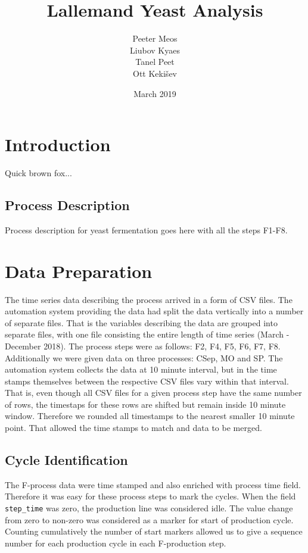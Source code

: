 \documentclass{article}
\title{Lallemand Yeast Analysis}
\author{Peeter Meos \\ Liubov Kyaes \\ Tanel Peet \\Ott Keki{\v s}ev}
\date{March 2019}
\begin{document}
\maketitle

\tableofcontents

\section{Introduction}
Quick brown fox...
\subsection{Process Description}
Process description for yeast fermentation goes here with all the steps F1-F8.

\section{Data Preparation}
The time series data describing the process arrived in a form of CSV files. The automation system providing the data had split the data vertically into a number of separate files. That is the variables describing the data are grouped into separate files, with one file consisting the entire length of time series (March - December 2018). The process steps were as follows: F2, F4, F5, F6, F7, F8. Additionally we were given data on three processes: CSep, MO and SP. The automation system collects the data at 10 minute interval, but in the time stamps themselves between the respective CSV files vary within that interval. That is, even though all CSV files for a given process step have the same number of rows, the timestaps for these rows are shifted but remain inside 10 minute window. Therefore we rounded all timestamps to the nearest smaller 10 minute point. That allowed the time stamps to match and data to be merged.

\subsection{Cycle Identification}
The F-process data were time stamped and also enriched with process time field. Therefore it was easy for these process steps to mark the cycles. When the field \texttt{step\_time} was zero, the production line was considered idle. The value change from zero to non-zero was considered as a marker for start of production cycle. Counting cumulatively the number of start markers allowed us to give a sequence number for each production cycle in each F-production step.
\end{document}
